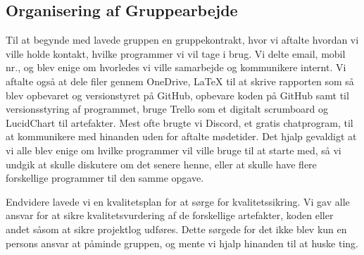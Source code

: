 \subsection{Organisering af Gruppearbejde}

Til at begynde med lavede gruppen en gruppekontrakt, hvor vi aftalte hvordan vi ville holde kontakt, hvilke programmer vi vil tage i brug.
Vi delte email, mobil nr., og blev enige om hvorledes vi ville samarbejde og kommunikere internt.
Vi aftalte også at dele filer gennem OneDrive, \LaTeX{} til at skrive rapporten som så blev opbevaret og versionstyret på GitHub, opbevare koden på GitHub samt til versionsstyring af programmet, bruge Trello som et digitalt scrumboard og LucidChart til artefakter.
Mest ofte brugte vi Discord, et gratis chatprogram, til at kommunikere med hinanden uden for aftalte mødetider. Det hjalp gevaldigt at vi alle blev enige om hvilke programmer vil ville bruge til at starte med, så vi undgik at skulle diskutere om det senere henne, eller at skulle have flere forskellige programmer til den samme opgave.

Endvidere lavede vi en kvalitetsplan for at sørge for kvalitetssikring. Vi gav alle ansvar for at sikre kvalitetsvurdering af de forskellige artefakter, koden eller andet såsom at sikre projektlog udføres. Dette sørgede for det ikke blev kun en persons ansvar at påminde gruppen, og mente vi hjalp hinanden til at huske ting.

